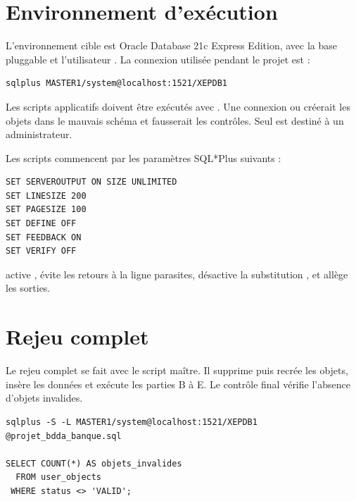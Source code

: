 \section{Environnement d'exécution}

L'environnement cible est Oracle Database 21c Express Edition, avec la base
pluggable  et l'utilisateur . La connexion utilisée
pendant le projet est :

\begin{lstlisting}[caption={Connexion SQL*Plus au schéma du projet.},label={lst:connexion},language={}]
sqlplus MASTER1/system@localhost:1521/XEPDB1
\end{lstlisting}

\begin{attentionbox}
Les scripts applicatifs doivent être exécutés avec . Une
connexion  ou  créerait les objets dans le mauvais
schéma et fausserait les contrôles. Seul
 est destiné à un administrateur.
\end{attentionbox}

Les scripts commencent par les paramètres SQL*Plus suivants :

\begin{lstlisting}[caption={Paramètres communs aux scripts SQL.},label={lst:parametres-sql}]
SET SERVEROUTPUT ON SIZE UNLIMITED
SET LINESIZE 200
SET PAGESIZE 100
SET DEFINE OFF
SET FEEDBACK ON
SET VERIFY OFF
\end{lstlisting}

 active ,  évite les
retours à la ligne parasites,  désactive la substitution
\code{\&}, et  allège les sorties.

\section{Rejeu complet}

Le rejeu complet se fait avec le script maître. Il supprime puis recrée les
objets, insère les données et exécute les parties B à E. Le contrôle final
vérifie l'absence d'objets invalides.

\begin{lstlisting}[caption={Rejeu complet et contrôle final.},label={lst:rejeu},language={}]
sqlplus -S -L MASTER1/system@localhost:1521/XEPDB1 @projet_bdda_banque.sql

SELECT COUNT(*) AS objets_invalides
  FROM user_objects
 WHERE status <> 'VALID';
\end{lstlisting}

